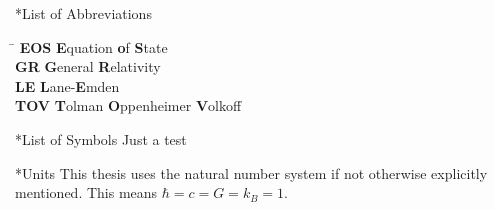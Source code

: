 \thispagestyle{empty}
\begin{section}*{List of Abbreviations}
\begin{tabbing}
\hspace{2cm}\= \kill
\textbf{EOS}        \> \textbf{E}quation \textbf{o}f \textbf{S}tate\\
\textbf{GR} 		\> \textbf{G}eneral \textbf{R}elativity \\
\textbf{LE}			\> \textbf{L}ane-\textbf{E}mden\\
\textbf{TOV}		\> \textbf {T}olman \textbf{O}ppenheimer \textbf{V}olkoff


\end{tabbing}


\end{section}
\begin{section}*{List of Symbols}
	Just a test
\end{section}

\begin{section}*{Units}
This thesis uses the natural number system if not otherwise explicitly mentioned. This means $\hbar=c=G=k_B=1$.
\end{section}
